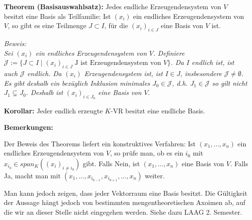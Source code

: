 \documentclass[11pt]{article}
\begin{document}
		\begin{mdframed}[backgroundcolor=blue!20]
			\textbf{Theorem (Basisauswahlsatz):} Jedes endliche Erzeugendensystem von $V$ besitzt eine Basis  als 
			Teilfamilie: Ist $(x_i)$ ein endliches Erzeugendensystem von $V$, so gibt es eine Teilmenge $J\subset I$, 
			für die $(x_i)_{i\in J}$ eine Basis von $V$ ist. 
		\end{mdframed}
		\textit{Beweis: \\
		Sei $(x_i)$ ein endliches Erzeugendensystem von $V$. Definiere $\mathcal J:=\{J \subset I \mid (x_i)_{i\in J}\; 
		\text{J ist Erzeugendensystem von }V\}$. Da $I$ endlich ist, ist auch $\mathcal J$ endlich. Da $(x_i)$ 
		Erzeugendensystem ist, ist $I\in J$, insbesondere $\mathcal J\neq\emptyset$. Es gibt deshalb ein bezüglich 
		Inklusion minimales $J_0\in \mathcal J$, d.h. $J_1 \in \mathcal J$ so gilt nicht $J_1 \subsetneq J_0$. Deshalb 
		ist $(x_i)_{i\in J_0}$ eine Basis von $V$.} \\
		
		\begin{framed}
			\textbf{Korollar:} Jeder endlich erzeugte $K$-VR besitzt eine endliche Basis.
		\end{framed}
		
		\textbf{Bemerkungen:}
		\begin{compactitem}
			\item Der Beweis des Theorems liefert ein konstruktives Verfahren: Ist $(x_1,...,x_n)$ ein endliches 
			Erzeugendensystem von $V$, so prüfe man, ob es ein $i_0$ mit $x_{i_0} \in span_K((x_i)_{i\neq i_0})$ gibt. 
			Falls Nein, ist $(x_1,...,x_n)$ eine Basis von $V$. Falls Ja, macht man mit $(x_1,...,x_{i_{0-1}}, x_{i_{0+1}},
			...,x_n)$ weiter.
			\item Man kann jedoch zeigen, dass jeder Vektorraum eine Basis besitzt. Die Gültigkeit der Aussage hängt jedoch 
			von bestimmten mengentheoretischen Axoimen ab, auf die wir an dieser Stelle nicht eingegehen werden. Siehe dazu 
			LAAG 2. Semester.
		\end{compactitem}
		
\end{document}

